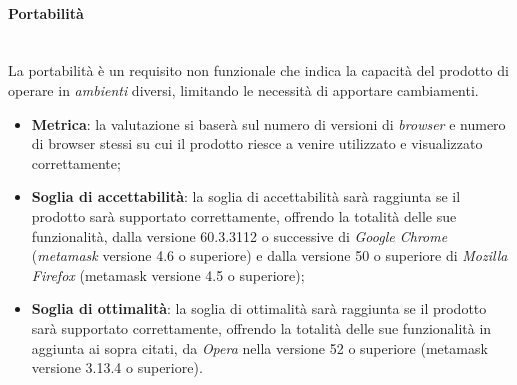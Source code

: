 \paragraph{Portabilità}
~\\La portabilità è un requisito non funzionale che indica la capacità del prodotto di operare in \textit{ambienti} diversi, limitando le necessità di apportare cambiamenti.
\begin{itemize}
	\item \textbf{Metrica}: la valutazione si baserà sul numero di versioni di \emph{browser} e numero di browser stessi su cui il prodotto riesce a venire utilizzato e visualizzato correttamente;
	\item \textbf{Soglia di accettabilità}: la soglia di accettabilità sarà raggiunta se il prodotto sarà supportato correttamente, offrendo la totalità delle sue funzionalità, dalla versione 60.3.3112 o successive di \emph{Google Chrome} (\emph{metamask} versione 4.6 o superiore) e dalla versione 50 o superiore di \emph{Mozilla Firefox} (metamask versione 4.5 o superiore);
	\item \textbf{Soglia di ottimalità}: la soglia di ottimalità sarà raggiunta se il prodotto sarà supportato correttamente, offrendo la totalità delle sue funzionalità in aggiunta ai sopra citati, da \emph{Opera} nella versione 52 o superiore (metamask versione 3.13.4 o superiore).
\end{itemize}



